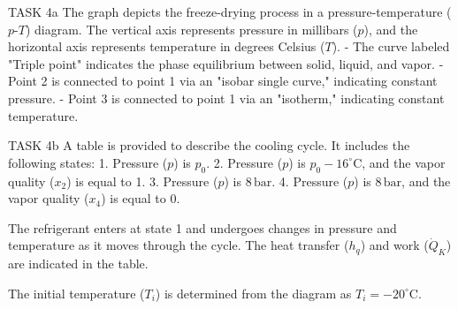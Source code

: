 TASK 4a  
The graph depicts the freeze-drying process in a pressure-temperature (\(p\)-\(T\)) diagram. The vertical axis represents pressure in millibars (\(p\)), and the horizontal axis represents temperature in degrees Celsius (\(T\)).  
- The curve labeled "Triple point" indicates the phase equilibrium between solid, liquid, and vapor.  
- Point 2 is connected to point 1 via an "isobar single curve," indicating constant pressure.  
- Point 3 is connected to point 1 via an "isotherm," indicating constant temperature.  

TASK 4b  
A table is provided to describe the cooling cycle. It includes the following states:  
1. Pressure (\(p\)) is \(p_0\).  
2. Pressure (\(p\)) is \(p_0 - 16^\circ\text{C}\), and the vapor quality (\(x_2\)) is equal to 1.  
3. Pressure (\(p\)) is \(8 \, \text{bar}\).  
4. Pressure (\(p\)) is \(8 \, \text{bar}\), and the vapor quality (\(x_4\)) is equal to 0.  

The refrigerant enters at state 1 and undergoes changes in pressure and temperature as it moves through the cycle. The heat transfer (\(h_q\)) and work (\(\dot{Q}_K\)) are indicated in the table.  

The initial temperature (\(T_i\)) is determined from the diagram as \(T_i = -20^\circ\text{C}\).